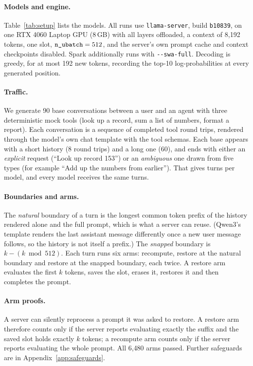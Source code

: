 \paragraph{Models and engine.}
Table~\ref{tab:setup} lists the models. All runs use \texttt{llama-server},
build \texttt{b10839}, on one RTX 4060 Laptop GPU (8\,GB) with all layers
offloaded, a context of 8{,}192 tokens, one slot, $\texttt{n\_ubatch} = 512$, and the
server's own prompt cache and context checkpoints disabled. Spark additionally
runs with \texttt{-{}-swa-full}. Decoding is greedy, for at most 192 new tokens,
recording the top-10 log-probabilities at every generated position.

\paragraph{Traffic.}
We generate 90 base conversations between a user and an agent with three
deterministic mock tools (look up a record, sum a list of numbers, format a
report). Each conversation is a sequence of completed tool round trips, rendered
through the model's own chat template with the tool schemas. Each base appears
with a short history (8 round trips) and a long one (60), and ends with either
an \emph{explicit} request (``Look up record 153'') or an \emph{ambiguous} one
drawn from five types (for example ``Add up the numbers from earlier''). That
gives \TurnsPerModel{} turns per model, and every model receives the same turns.

\paragraph{Boundaries and arms.}
The \emph{natural} boundary of a turn is the longest common token prefix of the
history rendered alone and the full prompt, which is what a server can reuse.
(Qwen3's template renders the last assistant message differently once a new user
message follows, so the history is not itself a prefix.) The \emph{snapped}
boundary is $k - (k \bmod 512)$. Each turn runs six arms: recompute, restore at
the natural boundary and restore at the snapped boundary, each twice. A restore
arm evaluates the first $k$ tokens, saves the slot, erases it, restores it and
then completes the prompt.

\paragraph{Arm proofs.}
A server can silently reprocess a prompt it was asked to restore. A restore arm
therefore counts only if the server reports evaluating exactly the suffix and
the saved slot holds exactly $k$ tokens; a recompute arm counts only if the
server reports evaluating the whole prompt.
All 6{,}480 arms passed. Further safeguards are in Appendix~\ref{app:safeguards}.

